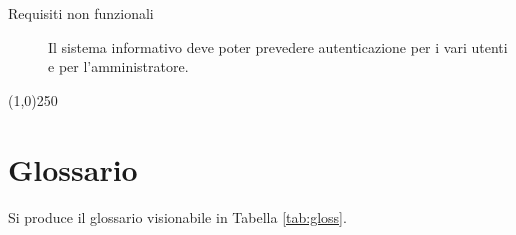 \begin{description}
\begin{description}
\end{description}
                

\item[Requisiti non funzionali]
\begin{itemize}
\diam Il sistema informativo deve poter prevedere autenticazione per i vari
	utenti e per l'amministratore.
\end{itemize}
\end{description}



\begin{center}
\line(1,0){250}
\end{center}


\section{Glossario}\label{sec:glossario}
Si produce il glossario visionabile in Tabella \vref{tab:gloss}. 

